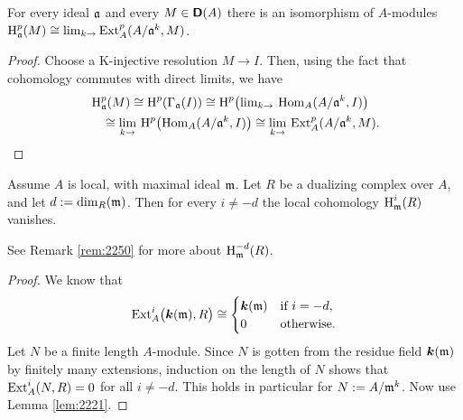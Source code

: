\begin{lem} \label{lem:2221}
For every ideal $\mathfrak{a}$ and every $M \in \boldsymbol{\mathsf{D}}(A)$ there is an isomorphism of 
$A$-modules 
$\operatorname{H}^p_{\mathfrak{a}}(M) \cong \lim_{k \to} \operatorname{Ext}^p_A( A / \mathfrak{a}^k, M)$.
\end{lem}

\begin{proof}
Choose a K-injective resolution $M \to I$. Then, using the fact that cohomology 
commutes with direct limits, we have
\[ \begin{aligned}
& \operatorname{H}^p_{\mathfrak{a}}(M) \cong \operatorname{H}^p(\Gamma_{\mathfrak{a}}(I)) \cong 
\operatorname{H}^p \bigl( \lim\nolimits_{k \to} \, \operatorname{Hom}_A(A / \mathfrak{a}^k, I) \bigr)
\\ & \quad \cong  
\lim_{k \to} \, \operatorname{H}^p \bigl( \operatorname{Hom}_A (A / \mathfrak{a}^k, I) \bigr) 
\cong \lim_{k \to} \, \operatorname{Ext}^p_A(A / \mathfrak{a}^k, M) .
\end{aligned} \]
\end{proof}

\begin{lem} \label{lem:2250}
Assume $A$ is local, with maximal ideal $\mathfrak{m}$. Let $R$ be a dualizing complex 
over $A$, and let $d := \operatorname{dim}_R(\mathfrak{m})$. Then for every $i \neq -d$ 
the local cohomology $\operatorname{H}^{i}_{\mathfrak{m}}(R)$ vanishes. 
\end{lem}

See Remark \ref{rem:2250} for more about $\operatorname{H}^{-d}_{\mathfrak{m}}(R)$. 

\begin{proof}
We know that 
\[ \operatorname{Ext}^i_{A} \bigl( \boldsymbol{k}(\mathfrak{m}), R \bigr) \cong 
\begin{cases}
\boldsymbol{k}(\mathfrak{m}) & \textup{if} \ i = -d , 
\\
0 & \textup{otherwise} .
\end{cases} \]
Let $N$ be a finite length $A$-module. Since $N$ is gotten from the residue 
field $\boldsymbol{k}(\mathfrak{m})$ by finitely many extensions, induction on the length of $N$ 
shows that 
$\operatorname{Ext}^i_{A}(N, R) = 0$ for all $i \neq -d$. 
This holds in particular for $N := A / \mathfrak{m}^k$. 
Now use Lemma \ref{lem:2221}.
\end{proof}


